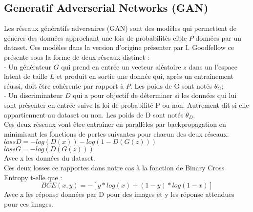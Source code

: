 \documentclass[11pt,francais]{article}
\begin{document}
\subsection{Generatif Adverserial Networks (GAN)}
\label{sec:GAN}
Les réseaux génératifs adversaires (GAN) sont des modèles qui permettent de générer des données approchant une lois de probabilités cible \(P\) données par un dataset.
Ces modèles dans la version d'origine présenter par I. Goodfellow \cite{NIPS2014_5423} ce présente sous la forme de deux réseaux distinct : \\
  - Un générateur \(G\) qui prend en entrée un vecteur aléatoire \(z\) dans un l'espace latent de taille \(L\) et produit en sortie une donnée qui, après un entraînement réussi, doit être cohérente par rapport à \(P\). Les poids de G sont notés \(\theta_G\);\\
  - Un discriminateur \(D\) qui a pour objectif de déterminer si les données qui lui sont présenter en entrée suive la loi de probabilité P ou non. Autrement dit si elle appartiennent au dataset ou non.
  Les poids de D sont notés \(\theta_D\).\\
Ces deux réseaux vont être entraîner en parallèles par backpropagation en minimisant les fonctions de pertes suivantes pour chacun des deux réseaux.\\
\(lossD = -log(D(x)) - log(1-D(G(z))) \) \\
\(lossG = -log(D(G(z))) \) \\
Avec x les données du dataset.\\
Ces deux losses ce rapportes dans notre cas à la fonction de Binary Cross Entropy t-elle que : 
\[
BCE(x, y) = -[y * log(x) + (1 - y) * log(1 - x)]
\]
Avec x les réponse données par D pour des images et y les réponse attendues pour ces images.
\end{document}
